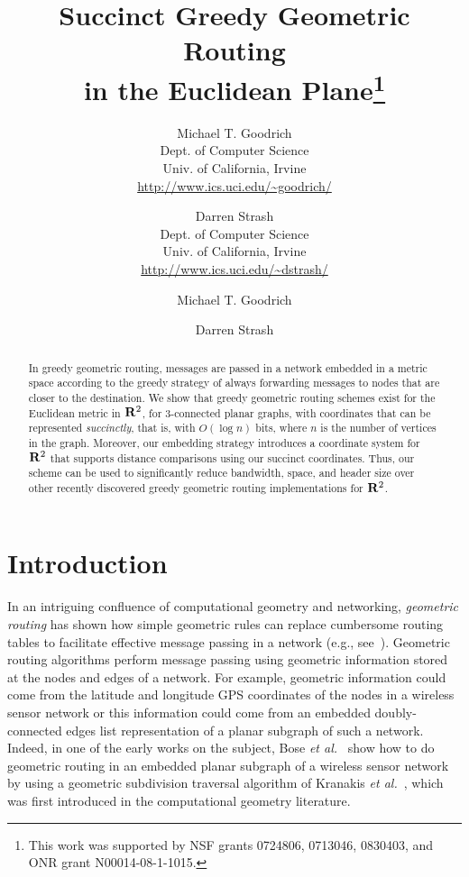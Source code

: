 \documentclass[11pt]{article}
\title{Succinct Greedy Geometric Routing \\
in the Euclidean Plane\thanks{This work was supported by
NSF grants 0724806, 0713046, 0830403, and ONR grant
N00014-08-1-1015.}\\[-12pt]}
\author{Michael T. Goodrich \\
Dept. of Computer Science \\
Univ. of California, Irvine \\
\url{http://www.ics.uci.edu/~goodrich/}
\and 
Darren Strash \\
Dept. of Computer Science \\
Univ. of California, Irvine \\
\url{http://www.ics.uci.edu/~dstrash/}
}
\date{}
\author{Michael T. Goodrich \and Darren Strash}
\institute{Computer Science Department, University of California, Irvine, USA.}
\newcommand{\R}{{\bf R}}
\begin{document}
\maketitle

\ifFull
\pagestyle{plain}
\setcounter{page}{1}
\fi

\begin{abstract}
\ifFull
In greedy geometric routing, messages are passed in a network
embedded in a metric space according to the greedy strategy of
always forwarding messages to nodes that are closer to the destination.
\fi
We show that greedy geometric routing schemes exist for the Euclidean
metric in $\R^2$, for 3-connected planar graphs, 
with coordinates that can be represented \emph{succinctly}, that
is, with $O(\log{n})$ bits, where $n$ is the number of vertices
in the graph.  
\ifFull Moreover, our embedding strategy
introduces a coordinate system for $\R^2$ that supports distance
comparisons using our succinct coordinates. \fi
\ifFull
Thus, our scheme can
be used to significantly reduce bandwidth, space, and header size
over other recently discovered greedy geometric routing implementations
for $\R^2$.
\fi
\end{abstract}

\section{Introduction}

\ifFull
In an intriguing confluence of computational geometry and networking, 
\emph{geometric routing} has shown how simple
geometric rules can replace cumbersome routing tables
to facilitate effective message passing in a network
(e.g., see~\cite{bmsu-rgdah-01, eg-sggdh-08,kk-gpsr-00,k-gruhs-07,kwzz-gacr-03,kwz-aogma-02,kwz-wcoac-03}).
\fi
Geometric routing algorithms
perform message passing using geometric information
stored at the nodes and edges of a network.
\ifFull
For example,
geometric information could come from the latitude and longitude GPS 
coordinates of the nodes in a wireless sensor network or 
this information could come from an embedded doubly-connected 
edges list representation of
a planar subgraph of such a network.
Indeed, in one of the early works on the subject, 
Bose \textit{et al.}~\cite{bmsu-rgdah-01}
show how to do geometric routing in an embedded planar subgraph of a wireless
sensor network by using a geometric subdivision traversal 
algorithm of Kranakis {\it et al.}~\cite{kranakiscompass}, which was first
introduced in the computational geometry literature.
\fi
\end{document}
